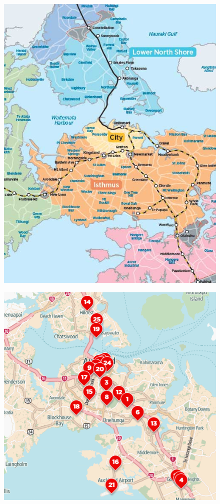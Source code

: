 \documentclass[twoside, a4paper, 11pt]{article}
\begin{document}
\begin{figure}
\centering
\begin{minipage}{.5\textwidth}
  \centering
  \includegraphics[width=0.8\linewidth]{Auckland_Geographical_Zones.png}
  \label{fig:auckgeozones}
\end{minipage}%
\begin{minipage}{.5\textwidth}
  \centering
  \includegraphics[width=0.8\linewidth]{Localised_Congestion_Hot-Spots.png}
  \label{fig:lchs}
\end{minipage}
\end{figure}
\end{document}
